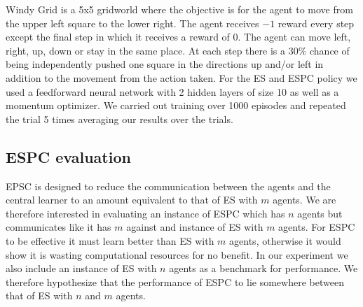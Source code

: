 Windy Grid is a 5x5 gridworld where the objective is for the agent to move from the upper left square to the lower right. The agent receives $-1$ reward every step except the final step in which it receives a reward of $0$. The agent can move left, right, up, down or stay in the same place. At each step there is a $30\%$ chance of being independently pushed one square in the directions up and/or left in addition to the movement from the action taken. For the ES and ESPC policy we used a feedforward neural network with 2 hidden layers of size 10 as well as a momentum optimizer.
We carried out training over 1000 episodes and repeated the trial 5 times averaging our results over the trials. 

\subsection{ESPC evaluation}
EPSC is designed to reduce the communication between the agents and the central learner to an amount equivalent to that of ES with $m$ agents. 
We are therefore interested in evaluating an instance of ESPC which has $n$ agents but communicates like it has $m$ against and instance of ES with $m$ agents. 
For ESPC to be effective it must learn better than ES with $m$ agents, otherwise it would show it is wasting computational resources for no benefit. 
In our experiment we also include an instance of ES with $n$ agents as a benchmark for performance. 
We therefore hypothesize that the performance of ESPC to lie somewhere between that of ES with $n$ and $m$ agents.

